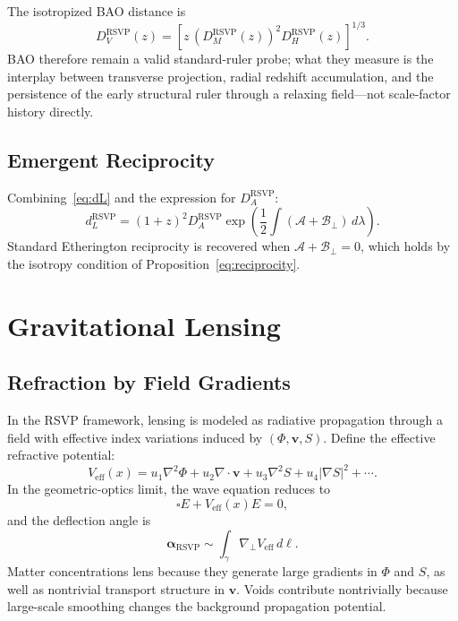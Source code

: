\documentclass[12pt,a4paper]{article}
\theoremstyle{remark}
\newcommand{\vv}{\mathbf{v}}
\newcommand{\Acal}{\mathcal{A}}
\newcommand{\Bcal}{\mathcal{B}}
\newcommand{\dL}{d_L^{\mathrm{RSVP}}}
\newcommand{\DAr}{D_A^{\mathrm{RSVP}}}
\newcommand{\DHr}{D_H^{\mathrm{RSVP}}}
\newcommand{\DMr}{D_M^{\mathrm{RSVP}}}
\newcommand{\DVr}{D_V^{\mathrm{RSVP}}}
\begin{document}
The isotropized BAO distance is
\begin{equation}
\DVr(z) = \left[z\,(\DMr(z))^2\DHr(z)\right]^{1/3}.
\end{equation}
BAO therefore remain a valid standard-ruler probe; what they measure is the interplay between transverse projection, radial redshift accumulation, and the persistence of the early structural ruler through a relaxing field---not scale-factor history directly.

\subsection{Emergent Reciprocity}

Combining~\eqref{eq:dL} and the expression for $\DAr$:
\begin{equation}
\dL = (1+z)^2\DAr \exp\!\left(\frac12\int(\Acal + \Bcal_\perp)\, d\lambda\right).
\end{equation}
Standard Etherington reciprocity is recovered when $\Acal + \Bcal_\perp = 0$, which holds by the isotropy condition of Proposition~\ref{eq:reciprocity}.

\section{Gravitational Lensing}
\label{sec:lensing}

\subsection{Refraction by Field Gradients}

In the RSVP framework, lensing is modeled as radiative propagation through a field with effective index variations induced by $(\Phi, \vv, S)$. Define the effective refractive potential:
\begin{equation}
V_{\mathrm{eff}}(x) = u_1 \nabla^2\Phi + u_2 \nabla\cdot\vv + u_3 \nabla^2 S + u_4 |\nabla S|^2 + \cdots.
\end{equation}
In the geometric-optics limit, the wave equation reduces to
\begin{equation}
\square E + V_{\mathrm{eff}}(x)E = 0,
\end{equation}
and the deflection angle is
\begin{equation}
\boldsymbol{\alpha}_{\mathrm{RSVP}} \sim \int_\gamma \nabla_\perp V_{\mathrm{eff}}\, d\ell.
\end{equation}
Matter concentrations lens because they generate large gradients in $\Phi$ and $S$, as well as nontrivial transport structure in $\vv$. Voids contribute nontrivially because large-scale smoothing changes the background propagation potential.
\end{document}
